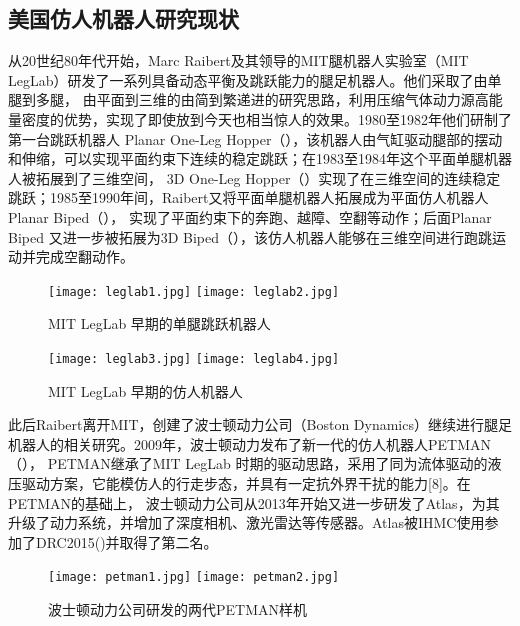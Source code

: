 \subsection{美国仿人机器人研究现状}
从20世纪80年代开始，Marc Raibert及其领导的MIT腿机器人实验室（MIT LegLab）研发了一系列具备动态平衡及跳跃能力的腿足机器人。他们采取了由单腿到多腿，
由平面到三维的由简到繁递进的研究思路，利用压缩气体动力源高能量密度的优势，实现了即使放到今天也相当惊人的效果。1980至1982年他们研制了第一台跳跃机器人
Planar One-Leg Hopper（），该机器人由气缸驱动腿部的摆动和伸缩，可以实现平面约束下连续的稳定跳跃；在1983至1984年这个平面单腿机器人被拓展到了三维空间，
3D One-Leg Hopper（）实现了在三维空间的连续稳定跳跃；1985至1990年间，Raibert又将平面单腿机器人拓展成为平面仿人机器人Planar Biped（），
实现了平面约束下的奔跑、越障、空翻等动作；后面Planar Biped 又进一步被拓展为3D Biped（），该仿人机器人能够在三维空间进行跑跳运动并完成空翻动作\cite{raibert1986legged}。
\begin{figure}[htbp]
    \centering
        {%
            \texttt{[image: leglab1.jpg]}}
        {%
            \texttt{[image: leglab2.jpg]}}
    \caption{MIT LegLab 早期的单腿跳跃机器人\label{fig:leglab}}
\end{figure}
\begin{figure}[htbp]
    \centering
        {%
            \texttt{[image: leglab3.jpg]}}
        {%
            \texttt{[image: leglab4.jpg]}}
    \caption{MIT LegLab 早期的仿人机器人\label{fig:leglab_biped}}
\end{figure}
此后Raibert离开MIT，创建了波士顿动力公司（Boston Dynamics）继续进行腿足机器人的相关研究。2009年，波士顿动力发布了新一代的仿人机器人PETMAN（），
PETMAN继承了MIT LegLab 时期的驱动思路，采用了同为流体驱动的液压驱动方案，它能模仿人的行走步态，并具有一定抗外界干扰的能力[8]。在PETMAN的基础上，
波士顿动力公司从2013年开始又进一步研发了Atlas，为其升级了动力系统，并增加了深度相机、激光雷达等传感器。Atlas被IHMC使用参加了DRC2015()并取得了第二名。
\begin{figure}[htbp]
    \centering
        {%
            \texttt{[image: petman1.jpg]}}
        {%
            \texttt{[image: petman2.jpg]}}
    \caption{波士顿动力公司研发的两代PETMAN样机\label{fig:leglab_biped}}
\end{figure}
